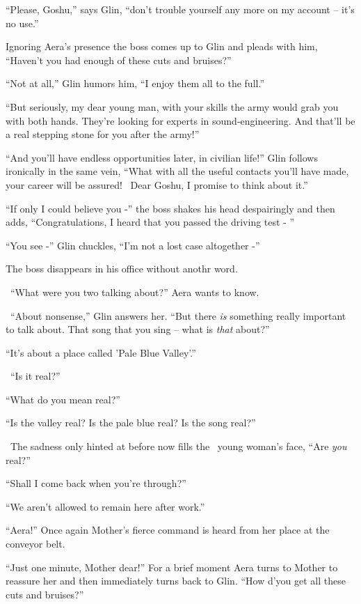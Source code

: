 \documentclass[twoside,11pt]{book}
\begin{document}
``Please, Goshu,'' says Glin, ``don't trouble yourself any more on my account --
it's no use.''

Ignoring Aera's presence the boss comes up to Glin and pleads with him, ``Haven't you had enough of these
cuts and bruises?''

``Not at all,'' Glin humors him, ``I enjoy them all to the full.''

``But seriously, my dear young man, with your skills the army would grab you with both hands. They're
looking for experts in sound-engineering. And that'll be a real stepping stone for you after the army!''

``And you'll have endless opportunities later, in civilian life!'' Glin follows
ironically{ }in the same vein, ``What with all the useful contacts you'll have made, your
career will be assured! ~Dear Goshu, I promise to think about it.''

``If only I could believe you -'' the boss shakes his head despairingly and
then adds, ``Congratulations, I heard that you passed the driving test - ''

``You see -'' Glin chuckles, ``I'm not a lost case altogether
-''

The boss disappears in his office without anothr word.

{\ }``What were you two talking about?'' Aera wants to know.

~``About nonsense,'' Glin answers her. ``But there \textit{is} something really
important to talk about. That song that you sing -- what is \textit{that} about?''

``It's about a place called 'Pale Blue Valley'.''

~``Is it real?''

``What do you mean real?''

``Is the valley real? Is the pale blue real? Is the song real?''

~The sadness only hinted at before now fills the \ young woman's face, ``Are \textit{you}
real?''

``Shall I come back when you're through?''

``We aren't allowed to remain here after work.''

``Aera!'' Once again Mother's fierce command is heard from her place at the conveyor belt.

``Just one minute, Mother dear!'' For a brief moment\MakeUppercase{ a}era turns to Mother to
reassure her and then immediately turns back to Glin. ``How d'you get all these cuts and
bruises?''
\end{document}
